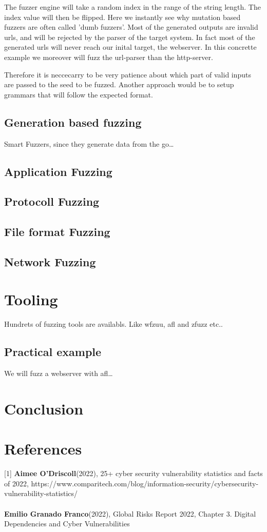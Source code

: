 \documentclass[journal=tosc,final]{iacrtrans}
\begin{document}
The fuzzer engine will take a random index in the range of the string length. The index value will then be flipped.  Here we instantly see why mutation based fuzzers are often called 'dumb fuzzers'. 
Most of the generated outputs are invalid urls, and will be rejected by the parser of the target system. In fact most of the generated urls will never reach our inital target, the webserver. In this concrette example we moreover will fuzz the url-parser than the http-server.

Therefore it is neccecarry to be very patience about which part of valid inputs are passed to the seed to be fuzzed. Another approach would be to setup grammars that will follow the expected format.
\newpage
\subsection{Generation based fuzzing}
Smart Fuzzers, since they generate data from the go\dots
\newpage
\subsection{Application Fuzzing}

\subsection{Protocoll Fuzzing}
\subsection{File format Fuzzing}
\subsection{Network Fuzzing}
\newpage
\section{Tooling}
Hundrets of fuzzing tools are availabls. Like wfzuu, afl and zfuzz etc..
\subsection{Practical example}
We will fuzz a webserver with afl\dots
\section{Conclusion}




\section{References}
[1] \textbf{Aimee O'Driscoll}(2022), 25+ cyber security vulnerability statistics and facts of 2022, https://www.comparitech.com/blog/information-security/cybersecurity-vulnerability-statistics/\\
\\
\noindent[2] \textbf{Emilio Granado Franco}(2022),  Global Risks Report 2022, Chapter 3. Digital Dependencies and Cyber Vulnerabilities\\
\end{document}
